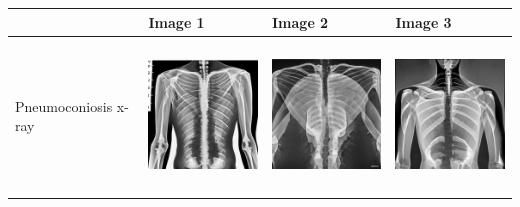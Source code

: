 \begin{table}[H]
\centering
\begin{tabularx}{\linewidth}{@{}>{\centering\arraybackslash}m{3cm}>{\centering\arraybackslash}X>{\centering\arraybackslash}X>{\centering\arraybackslash}X@{}}
\toprule
 & Image 1 & Image 2 & Image 3 \\
\midrule
Pneumoconiosis x-ray & \includegraphics[valign=M,width=\linewidth,height=4cm,keepaspectratio]{main/content/images/sd_textual_inversion/pneumoconiosis/ti.jpeg} & \includegraphics[valign=M,width=\linewidth,height=4cm,keepaspectratio]{main/content/images/sd_textual_inversion/pneumoconiosis/ti2.jpeg} & \includegraphics[valign=M,width=\linewidth,height=4cm,keepaspectratio]{main/content/images/sd_textual_inversion/pneumoconiosis/ti3.jpeg} \\
\midrule

\end{tabularx}
\end{table}
